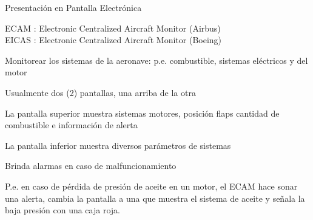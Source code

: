 \documentclass[10pt]{beamer}
\begin{document}
\begin{frame}{Presentaci\'on en Pantalla Electr\'onica}

  \begin{block}{ ECAM : Electronic Centralized Aircraft Monitor
    (Airbus) \\
     EICAS : Electronic Centralized Aircraft Monitor (Boeing)}


    Monitorear los sistemas de la aeronave: p.e. combustible, sistemas
    el\'ectricos y del motor

    Usualmente dos (2) pantallas, una arriba de la otra

    La pantalla superior muestra sistemas motores, posici\'on flaps
    cantidad de combustible e informaci\'on de alerta

    La pantalla inferior muestra diversos par\'ametros de sistemas

    Brinda alarmas en caso de malfuncionamiento

    P.e. en caso de p\'erdida de presi\'on de aceite en un motor, el
    ECAM hace sonar una alerta, cambia la pantalla a una que muestra
    el sistema de aceite y se\~nala la baja presi\'on con una caja
    roja.

  \end{block}
    \end{frame}
\end{document}
